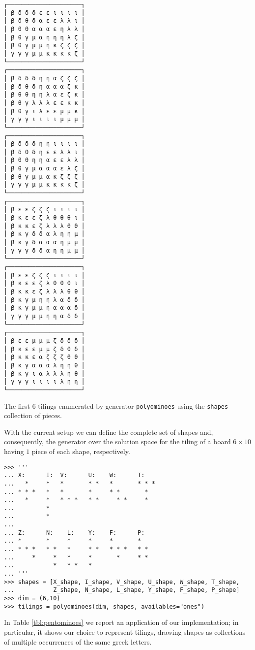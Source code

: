 \begin{margintable}
\inputminted[fontsize=\footnotesize,]{python}{backtracking/pentominoes-regular-snippet.py}
\begin{Verbatim}[baselinestretch=0.1, fontsize=\footnotesize]
┌─────────────────────┐
│ β δ δ δ ε ε ι ι ι ι │
│ β δ θ δ α ε ε λ λ ι │
│ β θ θ α α α ε η λ λ │
│ β θ γ μ α η η η λ ζ │
│ β θ γ μ μ η κ ζ ζ ζ │
│ γ γ γ μ μ κ κ κ κ ζ │
└─────────────────────┘
┌─────────────────────┐
│ β δ δ δ η η α ζ ζ ζ │
│ β δ θ δ η α α α ζ κ │
│ β θ θ η η λ α ε ζ κ │
│ β θ γ λ λ λ ε ε κ κ │
│ β θ γ ι λ ε ε μ μ κ │
│ γ γ γ ι ι ι ι μ μ μ │
└─────────────────────┘
┌─────────────────────┐
│ β δ δ δ η η ι ι ι ι │
│ β δ θ δ η ε ε λ λ ι │
│ β θ θ η η α ε ε λ λ │
│ β θ γ μ α α α ε λ ζ │
│ β θ γ μ μ α κ ζ ζ ζ │
│ γ γ γ μ μ κ κ κ κ ζ │
└─────────────────────┘
┌─────────────────────┐
│ β ε ε ζ ζ ζ ι ι ι ι │
│ β κ ε ε ζ λ θ θ θ ι │
│ β κ κ ε ζ λ λ λ θ θ │
│ β κ γ δ δ α λ η η μ │
│ β κ γ δ α α α η μ μ │
│ γ γ γ δ δ α η η μ μ │
└─────────────────────┘
┌─────────────────────┐
│ β ε ε ζ ζ ζ ι ι ι ι │
│ β κ ε ε ζ λ θ θ θ ι │
│ β κ κ ε ζ λ λ λ θ θ │
│ β κ γ μ η η λ α δ δ │
│ β κ γ μ μ η α α α δ │
│ γ γ γ μ μ η η α δ δ │
└─────────────────────┘
┌─────────────────────┐
│ β ε ε μ μ μ ζ δ δ δ │
│ β κ ε ε μ μ ζ δ θ δ │
│ β κ κ ε α ζ ζ ζ θ θ │
│ β κ γ α α α λ η η θ │
│ β κ γ ι α λ λ λ η θ │
│ γ γ γ ι ι ι ι λ η η │
└─────────────────────┘
\end{Verbatim}
\caption{The first $6$ tilings enumerated by generator \texttt{polyominoes}
using the \texttt{shapes} collection of pieces.}
\label{tbl:pentominoes}
\end{margintable}
With the current setup we can define the complete set of shapes and,
consequently, the generator over the solution space for the tiling of a board
$6\times 10$ having $1$ piece of each shape, respectively.
\begin{verbatim}
>>> '''
... X:      I:  V:      U:    W:      T:
...   *     *   *       * *   *       * * *
... * * *   *   *       *     * *       *
...   *     *   * * *   * *     * *     *
...         *
...         *
...
... Z:      N:    L:    Y:    F:      P:
... *       *     *     *     *       *
... * * *   * *   *     * *   * * *   * *
...     *     *   *     *       *     * *
...           *   * *   *
... '''
>>> shapes = [X_shape, I_shape, V_shape, U_shape, W_shape, T_shape,
...           Z_shape, N_shape, L_shape, Y_shape, F_shape, P_shape]
>>> dim = (6,10)
>>> tilings = polyominoes(dim, shapes, availables="ones")
\end{verbatim}
In Table \ref{tbl:pentominoes} we report an application of our implementation;
in particular, it shows our choice to represent tilings, drawing shapes as
collections of multiple occurrences of the same greek letters.

